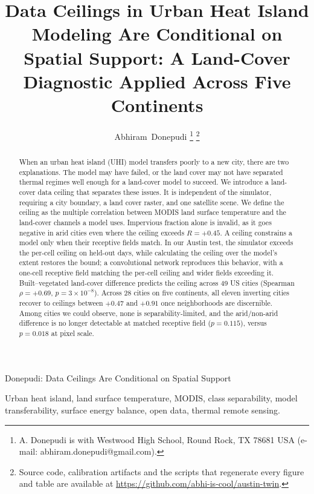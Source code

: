 \documentclass[journal]{IEEEtran}
\begin{document}
\title{Data Ceilings in Urban Heat Island Modeling Are Conditional on
Spatial Support: A Land-Cover Diagnostic Applied Across Five Continents}

\author{Abhiram~Donepudi%
\thanks{A. Donepudi is with Westwood High School, Round Rock, TX 78681 USA
(e-mail: abhiram.donepudi@gmail.com).}%
\thanks{Source code, calibration artifacts and the scripts that regenerate
every figure and table are available at
\url{https://github.com/abhi-is-cool/austin-twin}.}}

%
{Donepudi: Data Ceilings Are Conditional on Spatial Support}

\maketitle

\begin{abstract}
When an urban heat island (UHI) model transfers poorly to a new city,
there are two explanations. The model may have failed, or the land cover
may not have separated thermal regimes well enough for a land-cover model
to succeed. We introduce a land-cover data ceiling that separates these
issues. It is independent of the simulator, requiring a city boundary, a
land cover raster, and one satellite scene. We define the ceiling as the
multiple correlation between MODIS land surface temperature and the
land-cover channels a model uses. Impervious fraction alone is invalid, as
it goes negative in arid cities even where the ceiling exceeds
$R = +0.45$. A ceiling constrains a model only when their receptive fields
match. In our Austin test, the simulator exceeds the per-cell ceiling on
held-out days, while calculating the ceiling over the model's extent
restores the bound; a convolutional network reproduces this behavior, with
a one-cell receptive field matching the per-cell ceiling and wider fields
exceeding it. Built--vegetated land-cover difference predicts the ceiling
across 49 US cities (Spearman $\rho = +0.69$, $p = 3 \times 10^{-8}$).
Across 28 cities on five continents, all eleven inverting cities recover
to ceilings between $+0.47$ and $+0.91$ once neighborhoods are
discernible. Among cities we could observe, none is separability-limited, and the
arid/non-arid difference is no longer detectable at matched receptive
field ($p = 0.115$), versus $p = 0.018$ at pixel scale.
\end{abstract}

\begin{IEEEkeywords}
Urban heat island, land surface temperature, MODIS, class separability,
model transferability, surface energy balance, open data, thermal remote
sensing.
\end{IEEEkeywords}
\end{document}
